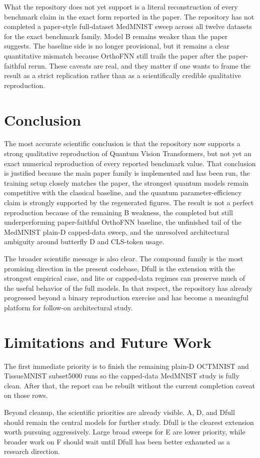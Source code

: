 \documentclass[11pt,a4paper]{article}
\def\papertitle{Quantum Vision Transformers}%
\def\texttt#1{#1}%
\def\_{}%
\newcommand{\papertitle}{\textit{Quantum Vision Transformers}}
\begin{document}
What the repository does not yet support is a literal reconstruction of every benchmark claim in the exact form reported in the paper. The repository has not completed a paper-style full-dataset MedMNIST sweep across all twelve datasets for the exact benchmark family. Model \texttt{B} remains weaker than the paper suggests. The baseline side is no longer provisional, but it remains a clear quantitative mismatch because \texttt{OrthoFNN} still trails the paper after the paper-faithful rerun. These caveats are real, and they matter if one wants to frame the result as a strict replication rather than as a scientifically credible qualitative reproduction.

\section{Conclusion}

The most accurate scientific conclusion is that the repository now supports a strong qualitative reproduction of \papertitle{}, but not yet an exact numerical reproduction of every reported benchmark value. That conclusion is justified because the main paper family is implemented and has been run, the training setup closely matches the paper, the strongest quantum models remain competitive with the classical baseline, and the quantum parameter-efficiency claim is strongly supported by the regenerated figures. The result is not a perfect reproduction because of the remaining \texttt{B} weakness, the completed but still underperforming paper-faithful \texttt{OrthoFNN} baseline, the unfinished tail of the MedMNIST plain-\texttt{D} capped-data sweep, and the unresolved architectural ambiguity around butterfly \texttt{D} and CLS-token usage.

The broader scientific message is also clear. The compound family is the most promising direction in the present codebase, \texttt{D\_full} is the extension with the strongest empirical case, and lite or capped-data regimes can preserve much of the useful behavior of the full models. In that respect, the repository has already progressed beyond a binary reproduction exercise and has become a meaningful platform for follow-on architectural study.

\section{Limitations and Future Work}

The first immediate priority is to finish the remaining plain-\texttt{D} OCTMNIST and TissueMNIST subset5000 runs so the capped-data MedMNIST study is fully clean. After that, the report can be rebuilt without the current completion caveat on those rows.

Beyond cleanup, the scientific priorities are already visible. \texttt{A}, \texttt{D}, and \texttt{D\_full} should remain the central models for further study. \texttt{D\_full} is the clearest extension worth pursuing aggressively. Large broad sweeps for \texttt{E} are lower priority, while broader work on \texttt{F} should wait until \texttt{D\_full} has been better exhausted as a research direction.
\end{document}
